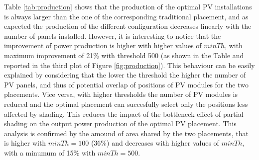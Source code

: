 Table \ref{tab:production} shows that the production of the optimal PV installations is always larger than the one of the corresponding traditional placement, and as expected the production of the different configuration decreases linearly with the number of panels installed. However, it is interesting to notice that the improvement of power production is higher with higher values of $minTh$, with maximum improvement of 21\% with threshold 500 (as shown in the Table and reported in the third plot of Figure \ref{fig:production}). This behaviour can be easily explained by considering that the lower the threshold the higher the number of PV panels, and thus of potential overlap of positions of PV modules for the two placements. Vice versa, with higher thresholds the number of PV modules is reduced and the optimal placement can succesfully select only the positions less affected by shading. This reduces the impact of the bottleneck effect of partial shading on the output power production of the optimal PV placement. This analysis is confirmed by the amound of area shared by the two placements, that is higher with $minTh=100$ (36\%) and decreases with higher values of $minTh$, with a minumum of 15\% with $minTh=500$.  


